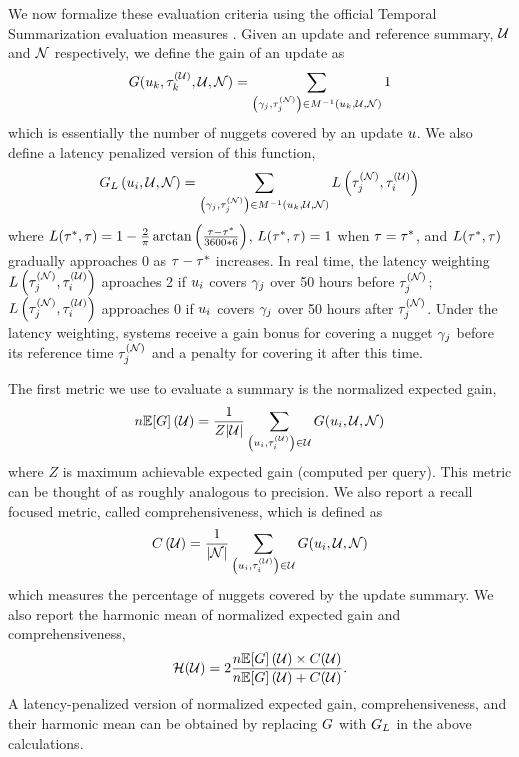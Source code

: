 We now formalize these evaluation criteria using the official Temporal
Summarization evaluation measures \citep{aslam2013}.  Given an update and
reference summary, $\mathcal{U}$ and $\mathcal{N}$ respectively, we define the
gain of an update as 
\[  
    G(u_k,\tau^{(\mathcal{U})}_k, \mathcal{U}, \mathcal{N}) =  
    \sum_{\left(\gamma_{j},\tau^{(\mathcal{N})}_{j}\right) \in  
    M^{-1}(u_k, \mathcal{U}, \mathcal{N})} 1 
\] 
which is essentially the number of nuggets covered by an update $u$.  We
also define a latency penalized version of this function, \[
G_L\left(u_i, \mathcal{U},\mathcal{N} \right) =
\sum_{\left(\gamma_{j},\tau^{(\mathcal{N})}_{j}\right) \in  M^{-1}(u_k,  \mathcal{U}, \mathcal{N})}
L\left(\tau^{(\mathcal{N})}_j, \tau^{(\mathcal{U})}_i\right)  \] where $L(\tau^*,
\tau) = 1 - \frac{2}{\pi}\arctan\left( \frac{\tau -
\tau^*}{3600 * 6} \right)$, $L(\tau^*,\tau) = 1$ when
$\tau=\tau^*$, and $L(\tau^*,\tau)$ gradually
approaches 0 as $\tau - \tau^*$ increases. In real time, the
latency weighting $L\left(\tau^{(\mathcal{N})}_j,\tau^{(\mathcal{U})}_i\right)$ aproaches 2 if
$u_i$ covers $\gamma_j$ over 50 hours before $\tau^{(\mathcal{N})}_j$;
$L\left(\tau^{(\mathcal{N})}_j,\tau^{(\mathcal{U})}_i\right)$ approaches 0 if $u_i$ covers
$\gamma_j$ over 50 hours after $\tau^{(\mathcal{N})}_j$. Under the latency weighting, systems
receive a gain bonus for covering a nugget $\gamma_j$ before its reference
time $\tau^{(\mathcal{N})}_j$ and a penalty for covering it after this time.

The first metric we use to evaluate a summary is the normalized expected gain,
\[
n\mathbb{E}[G]\left(\mathcal{U}\right) = \frac{1}{Z{\left\vert \mathcal{U} \right\vert}} 
\sum_{\left(u_{i},\tau^{(\mathcal{U})}_{i}\right) \in \mathcal{U}} 
    G(u_i, \mathcal{U}, \mathcal{N})\]
where $Z$ is maximum achievable expected gain (computed per query).  This
metric can be thought of as roughly analogous to precision.  We also report a
recall focused metric, called comprehensiveness, which is defined as 
\[
C\left(\mathcal{U}\right) = \frac{1}{{\left\vert \mathcal{N} \right\vert}} 
\sum_{\left(u_{i},\tau^{(\mathcal{U})}_{i}\right) \in \mathcal{U}} 
    G(u_i, \mathcal{U}, \mathcal{N})
\]
which measures the percentage of nuggets covered by the update summary. We also
report the harmonic mean of normalized expected gain and  comprehensiveness,
 \[ 
 \mathcal{H}(\mathcal{U}) = 
2 \frac{n\mathbb{E}[G]\left(\mathcal{U}\right) \times C(\mathcal{U})}
{  n\mathbb{E}[G]\left(\mathcal{U}\right) + C(\mathcal{U})   }.
\]
A latency-penalized version of normalized expected gain, comprehensiveness, and
their harmonic mean can be obtained by replacing $G$ with $G_L$
in the above calculations.
